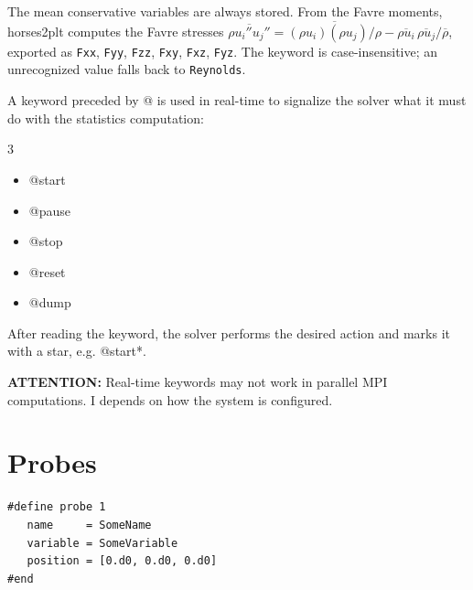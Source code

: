 \documentclass[a4paper,10pt]{report}
\begin{document}
The mean conservative variables are always stored. From the Favre moments, horses2plt computes the Favre stresses $\overline{\rho u_i'' u_j''} = \overline{(\rho u_i)(\rho u_j)/\rho} - \overline{\rho u_i}\,\overline{\rho u_j}/\overline{\rho}$, exported as \texttt{Fxx}, \texttt{Fyy}, \texttt{Fzz}, \texttt{Fxy}, \texttt{Fxz}, \texttt{Fyz}. The keyword is case-insensitive; an unrecognized value falls back to \texttt{Reynolds}.

A keyword preceded by @ is used in real-time to signalize the solver what it must do with the statistics computation:

\begin{multicols}{3}
\begin{itemize}
\item @start
\item @pause
\item @stop
\item @reset
\item @dump
\end{itemize}
\end{multicols}

After reading the keyword, the solver performs the desired action and marks it with a star, e.g. @start*.

\textbf{ATTENTION:} Real-time keywords may not work in parallel MPI computations. I depends on how the system is configured.


\section{Probes}

\begin{lstlisting}
#define probe 1
   name     = SomeName
   variable = SomeVariable
   position = [0.d0, 0.d0, 0.d0]
#end
\end{lstlisting}
\end{document}
